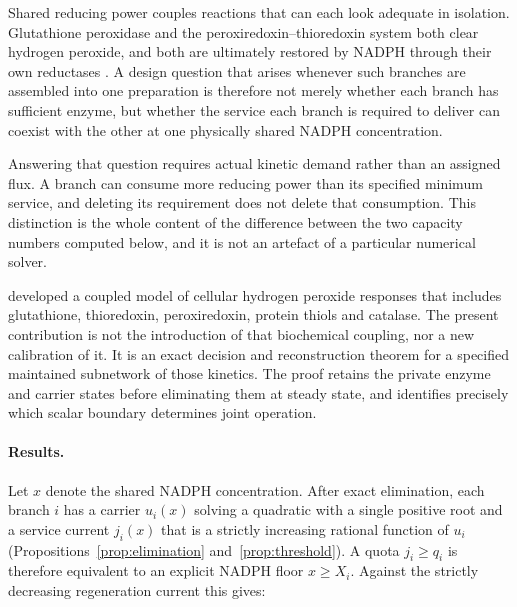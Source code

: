 \documentclass[11pt,a4paper]{article}
\theoremstyle{plain}
\theoremstyle{definition}
\theoremstyle{remark}
\begin{document}
Shared reducing power couples reactions that can each look adequate in isolation.
Glutathione peroxidase and the peroxiredoxin--thioredoxin system both clear
hydrogen peroxide, and both are ultimately restored by NADPH through their own
reductases \citep{winterbourn2008,lu2014,sies2017}. A design question that arises
whenever such branches are assembled into one preparation is therefore not merely
whether each branch has sufficient enzyme, but whether the service each branch is
required to deliver can coexist with the other at one physically shared NADPH
concentration.

Answering that question requires actual kinetic demand rather than an assigned
flux. A branch can consume more reducing power than its specified minimum service,
and deleting its requirement does not delete that consumption. This distinction is
the whole content of the difference between the two capacity numbers computed
below, and it is not an artefact of a particular numerical solver.

\citet{adimora2010} developed a coupled model of cellular hydrogen peroxide
responses that includes glutathione, thioredoxin, peroxiredoxin, protein thiols and
catalase. The present contribution is not the introduction of that biochemical
coupling, nor a new calibration of it. It is an exact decision and reconstruction
theorem for a specified maintained subnetwork of those kinetics. The proof retains
the private enzyme and carrier states before eliminating them at steady state, and
identifies precisely which scalar boundary determines joint operation.

\paragraph{Results.}
Let $x$ denote the shared NADPH concentration. After exact elimination, each branch
$i$ has a carrier $u_i(x)$ solving a quadratic with a single positive root and a
service current $j_i(x)$ that is a strictly increasing rational function of $u_i$
(Propositions~\ref{prop:elimination} and~\ref{prop:threshold}). A quota
$j_i\ge q_i$ is therefore equivalent to an explicit NADPH floor $x\ge X_i$. Against
the strictly decreasing regeneration current this gives:
\end{document}
